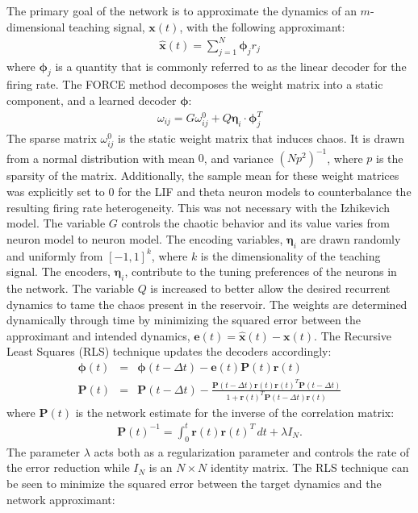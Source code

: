 \documentclass[11pt]{article} %
\begin{document}
 The primary goal of the network is to approximate the dynamics of an $m$-dimensional teaching signal, $\bm x(t)$, with the following approximant:
\begin{eqnarray}
\hat{\bm{x}}(t) = \sum_{j=1}^N \bm \phi_j r_j
\end{eqnarray}
where $\bm \phi_j$ is a quantity that is commonly referred to as the linear decoder for the firing rate.   
The FORCE method decomposes the weight matrix into a static component, and a learned decoder $ \bm{\phi}$:
\begin{eqnarray}
\omega_{ij} = G \omega^0_{ij} + Q \bm{\eta}_i \cdot \bm{\phi}_j  ^T
\end{eqnarray}
The sparse matrix $\omega_{ij}^0$ is the static weight matrix that induces chaos.  It is drawn from a normal distribution with mean $0$, and variance $(Np^2)^{-1}$, where $p$ is the sparsity of the matrix.  Additionally, the sample mean for these weight matrices was explicitly set to $0$ for the LIF and theta neuron models to counterbalance the resulting firing rate heterogeneity.  This was not necessary with the Izhikevich model.   The variable $G$ controls the chaotic behavior and its value varies from neuron model to neuron model.   The encoding variables, $\bm \eta_i$ are drawn randomly and uniformly from $[-1,1]^k$, where $k$ is the dimensionality of the teaching signal.  The encoders, $\bm \eta_i$, contribute to the tuning preferences of the neurons in the network.  The variable $Q$ is increased to better allow the desired recurrent dynamics to tame the chaos present in the reservoir.    The weights are determined dynamically through time by minimizing the squared error between the approximant and intended dynamics, $\bm{e}(t) = \hat{\bm{x}}(t) -\bm{x}(t)$.  The Recursive Least Squares (RLS) technique updates the decoders accordingly:
\begin{eqnarray}
\bm{\phi}(t) &=& \bm{\phi}(t-\Delta t) - \bm{e}(t)\bm{P}(t)\bm{r}(t) \label{eq14} \\
\bm{P}(t) &=& \bm{P}(t-\Delta t) -\frac{ \bm{P}(t-\Delta t) \bm{r}(t)\bm{r}(t)^T \bm{P}(t-\Delta t)}{1 + \bm{r}(t)^T \bm{P}(t-\Delta t) \bm{r}(t)} \label{eq15}
\end{eqnarray} 
where $\bm{P}(t)$ is the network estimate for the inverse of the correlation matrix:
\begin{eqnarray}
\bm{P}(t)^{-1} = \int_{0}^t \bm r(t) \bm r(t)^T \,dt + \lambda I_N .
\end{eqnarray}
The parameter $\lambda$ acts both as a regularization parameter \cite{haykin} and controls the rate of the error reduction while $I_N$ is an $N\times N$ identity matrix.  The RLS technique can be seen to minimize the squared error between the target dynamics and the network approximant:
\end{document}
